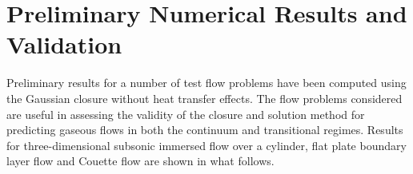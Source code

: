 \documentclass[titlepage,11pt,letterpaper]{article}
\begin{document}
\section{Preliminary Numerical Results and Validation}
Preliminary results for a number of test flow problems have been computed using the Gaussian 
closure without heat transfer effects. The flow problems considered are useful in assessing 
the validity of the closure and solution method for predicting gaseous flows in both the 
continuum and transitional regimes. Results for three-dimensional subsonic immersed flow 
over a cylinder, flat plate boundary layer flow and Couette flow are shown in what follows.

\end{document}
